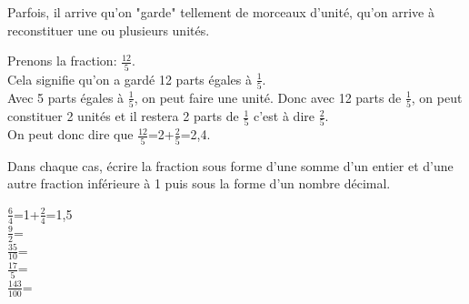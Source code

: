 Parfois, il arrive qu'on "garde" tellement de morceaux d'unité, qu'on arrive à reconstituer une ou plusieurs unités.

\begin{methode*1}
	\begin{exemple*1}
\vspace{0.5cm}	
	
Prenons la fraction: $\frac{12}{5}$.\\
Cela signifie qu'on a gardé 12 parts égales à $\frac{1}{5}$.\\
Avec 5 parts égales à $\frac{1}{5}$, on peut faire une unité. Donc avec 12 parts de $\frac{1}{5}$, on peut constituer 2 unités et il restera 2 parts de $\frac{1}{5}$ c'est à dire $\frac{2}{5}$.\\
On peut donc dire que $\frac{12}{5}$=2+$\frac{2}{5}$=2,4.

\begin{center}
\end{center}

\end{exemple*1}

\exercice

Dans chaque cas, écrire la fraction sous forme d'une somme d'un entier et d'une autre fraction inférieure à 1 puis sous la forme d'un nombre décimal.

$\frac{6}{4}$=1+$\frac{2}{4}$=1,5\\
$\frac{9}{2}$=\dotfill \\
$\frac{35}{10}$=\dotfill \\
$\frac{17}{5}$=\dotfill \\
$\frac{143}{100}$=\dotfill

\end{methode*1}

